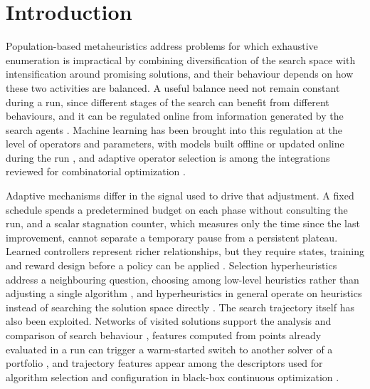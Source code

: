 \section{Introduction}
\label{sec:introduction}

Population-based metaheuristics address problems for which exhaustive enumeration is impractical by combining diversification of the search space with intensification around promising solutions, and their behaviour depends on how these two activities are balanced. A useful balance need not remain constant during a run, since different stages of the search can benefit from different behaviours, and it can be regulated online from information generated by the search agents \cite{vega2021learning}. Machine learning has been brought into this regulation at the level of operators and parameters, with models built offline or updated online during the run \cite{talbi2021machine_tax}, and adaptive operator selection is among the integrations reviewed for combinatorial optimization \cite{karimimamaghan2022machine}.

Adaptive mechanisms differ in the signal used to drive that adjustment. A fixed schedule spends a predetermined budget on each phase without consulting the run, and a scalar stagnation counter, which measures only the time since the last improvement, cannot separate a temporary pause from a persistent plateau. Learned controllers represent richer relationships, but they require states, training and reward design before a policy can be applied \cite{adriaensen2022automated}. Selection hyperheuristics address a neighbouring question, choosing among low-level heuristics rather than adjusting a single algorithm \cite{drake2020recent}, and hyperheuristics in general operate on heuristics instead of searching the solution space directly \cite{dokeroglu2024hyper}. The search trajectory itself has also been exploited. Networks of visited solutions support the analysis and comparison of search behaviour \cite{ochoa2021search}, features computed from points already evaluated in a run can trigger a warm-started switch to another solver of a portfolio \cite{jankovic2022trajectory}, and trajectory features appear among the descriptors used for algorithm selection and configuration in black-box continuous optimization \cite{cenikj2026survey}.

